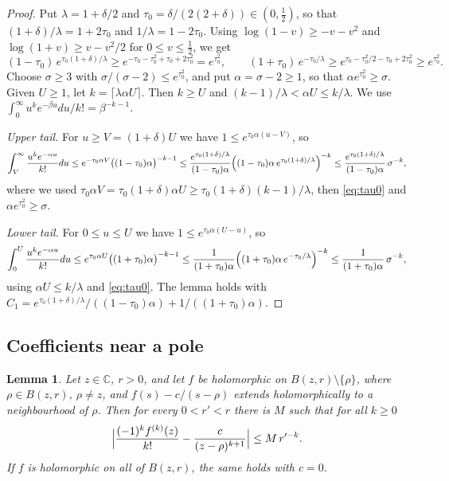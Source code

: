 \documentclass[11pt]{amsart}
\newcommand{\CC}{\mathbb{C}}
\theoremstyle{plain}
\newtheorem{lemma}[theorem]{Lemma}
\theoremstyle{definition}
\numberwithin{equation}{section}
\begin{document}
\begin{proof}
Put $\lambda=1+\delta/2$ and $\tau_0=\delta/(2(2+\delta))\in(0,\tfrac12)$, so that
$(1+\delta)/\lambda=1+2\tau_0$ and $1/\lambda=1-2\tau_0$. Using $\log(1-v)\ge-v-v^2$ and
$\log(1+v)\ge v-v^2/2$ for $0\le v\le\frac12$, we get
\begin{equation}\label{eq:tau0}
(1-\tau_0)\,e^{\tau_0(1+\delta)/\lambda}\ge e^{-\tau_0-\tau_0^2+\tau_0+2\tau_0^2}=e^{\tau_0^2},\qquad
(1+\tau_0)\,e^{-\tau_0/\lambda}\ge e^{\tau_0-\tau_0^2/2-\tau_0+2\tau_0^2}\ge e^{\tau_0^2}.
\end{equation}
Choose $\sigma\ge3$ with $\sigma/(\sigma-2)\le e^{\tau_0^2}$, and put $\alpha=\sigma-2\ge1$, so that
$\alpha e^{\tau_0^2}\ge\sigma$. Given $U\ge1$, let $k=\lceil\lambda\alpha U\rceil$. Then $k\ge U$ and
$(k-1)/\lambda<\alpha U\le k/\lambda$. We use $\int_0^\infty u^ke^{-\beta u}du/k!=\beta^{-k-1}$.

\emph{Upper tail.} For $u\ge V=(1+\delta)U$ we have $1\le e^{\tau_0\alpha(u-V)}$, so
\[
\int_V^\infty\frac{u^ke^{-\alpha u}}{k!}du\le e^{-\tau_0\alpha V}\bigl((1-\tau_0)\alpha\bigr)^{-k-1}
\le\frac{e^{\tau_0(1+\delta)/\lambda}}{(1-\tau_0)\alpha}\Bigl((1-\tau_0)\alpha\,e^{\tau_0(1+\delta)/\lambda}\Bigr)^{-k}
\le\frac{e^{\tau_0(1+\delta)/\lambda}}{(1-\tau_0)\alpha}\,\sigma^{-k},
\]
where we used $\tau_0\alpha V=\tau_0(1+\delta)\alpha U\ge\tau_0(1+\delta)(k-1)/\lambda$, then
\eqref{eq:tau0} and $\alpha e^{\tau_0^2}\ge\sigma$.

\emph{Lower tail.} For $0\le u\le U$ we have $1\le e^{\tau_0\alpha(U-u)}$, so
\[
\int_0^U\frac{u^ke^{-\alpha u}}{k!}du\le e^{\tau_0\alpha U}\bigl((1+\tau_0)\alpha\bigr)^{-k-1}
\le\frac{1}{(1+\tau_0)\alpha}\Bigl((1+\tau_0)\alpha\,e^{-\tau_0/\lambda}\Bigr)^{-k}
\le\frac{1}{(1+\tau_0)\alpha}\,\sigma^{-k},
\]
using $\alpha U\le k/\lambda$ and \eqref{eq:tau0}. The lemma holds with
$C_1=e^{\tau_0(1+\delta)/\lambda}/((1-\tau_0)\alpha)+1/((1+\tau_0)\alpha)$.
\end{proof}

\subsection{Coefficients near a pole}

\begin{lemma}\label{lem:cauchy}
Let $z\in\CC$, $r>0$, and let $f$ be holomorphic on $B(z,r)\setminus\{\rho\}$, where $\rho\in B(z,r)$,
$\rho\neq z$, and $f(s)-c/(s-\rho)$ extends holomorphically to a neighbourhood of $\rho$. Then for
every $0<r'<r$ there is $M$ such that for all $k\ge0$
\[
\Bigl|\frac{(-1)^kf^{(k)}(z)}{k!}-\frac{c}{(z-\rho)^{k+1}}\Bigr|\le M\,r'^{-k}.
\]
If $f$ is holomorphic on all of $B(z,r)$, the same holds with $c=0$.
\end{lemma}
\end{document}
